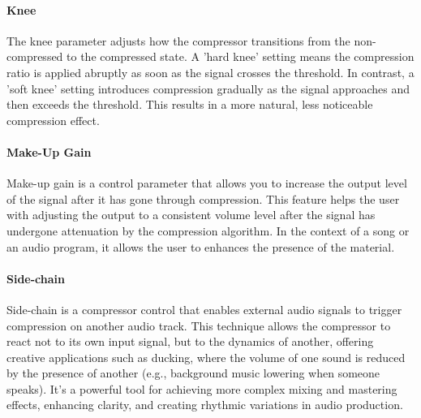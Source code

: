 \documentclass[10pt]{article}
\begin{document}
\begin{multicols*}{2}
                \noindent
                \begin{minipage}{\linewidth}
                    \centering
                    
                    \label{fig:comp-trans}
                \end{minipage}

            \paragraph{Knee}
                The knee parameter adjusts how the compressor transitions from the non-compressed to the compressed state. A 'hard knee' setting means the compression ratio is applied abruptly as soon as the signal crosses the threshold. In contrast, a 'soft knee' setting introduces compression gradually as the signal approaches and then exceeds the threshold. This results in a more natural, less noticeable compression effect.
            
            \paragraph{Make-Up Gain}
                Make-up gain is a control parameter that allows you to increase the output level of the signal after it has gone through compression. This feature helps the user with adjusting the output to a consistent volume level after the signal has undergone attenuation by the compression algorithm. In the context of a song or an audio program, it allows the user to enhances the presence of the material.

            \paragraph{Side-chain}
                Side-chain is a compressor control that enables external audio signals to trigger compression on another audio track. This technique allows the compressor to react not to its own input signal, but to the dynamics of another, offering creative applications such as ducking, where the volume of one sound is reduced by the presence of another (e.g., background music lowering when someone speaks). It's a powerful tool for achieving more complex mixing and mastering effects, enhancing clarity, and creating rhythmic variations in audio production.


\end{multicols*}
\end{document}
